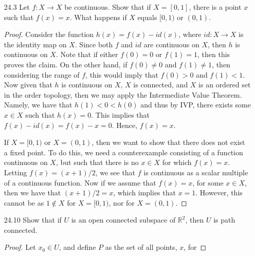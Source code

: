 \documentclass[12pt]{article}
\theoremstyle{definition}
\begin{document}
\begin{enumerate}
        \item[24.3] Let $f:X\to X$ be continuous. Show that if $X=[0, 1]$, there is
            a point $x$ such that $f(x)=x$. What happens if $X$ equals $[0, 1)$
            or $(0, 1)$.
            \begin{proof}
                Consider the function $h(x)=f(x)-id(x)$, where $id:X\to X$ is
                the identity map on $X$. Since both $f$ and $id$ are continuous
                on $X$, then $h$ is continuous on $X$. Note that if either
                $f(0)=0$ or $f(1)=1$, then this proves the claim. On the other
                hand, if $f(0)$ and $f(1)$, then considering the
                range of $f$, this would imply that $f(0)>0$ and $f(1)<1$. Now
                given that $h$ is continuous on $X$, $X$ is connected, and $X$ is an ordered set in the
                order topology, then we may apply the Intermediate Value
                Theorem. Namely, we have that $h(1)<0<h(0)$ and thus by IVP,
                there exists some $x\in X$ such that $h(x)=0$. This implies
                that $f(x)-id(x)=f(x)-x=0$. Hence, $f(x)=x$.\par\hspace{4mm} If
                $X=[0, 1)$ or $X=(0, 1)$, then we want to show that there does not exist
                a fixed point. To do this, we need a counterexample consisting
                of a function continuous on $X$, but such that there is no
                $x\in X$ for which $f(x)=x$. Letting $f(x)=(x+1)/2$, we see
                that $f$ is continuous as a scalar multiple of a continuous
                function. Now if we assume that $f(x)=x$, for some $x\in X$,
                then we have that $(x+1)/2=x$, which implies that $x=1$.
                However, this cannot be as $1\not\in X$ for $X=[0, 1)$, nor for
                $X=(0, 1)$.
            \end{proof}
        \item[24.10] Show that if $U$ is an open connected subspace of
            $^2$, then $U$ is path connected.
            \begin{proof}
                Let $x_0\in U$, and define $P$ as the set of all points, $x$, for

\end{proof}
\end{enumerate}
\end{document}
